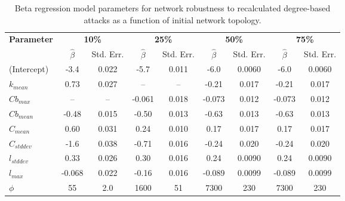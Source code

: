 \begin{table}[!htp]
\scriptsize
\centering

\begin{tabular}{lcccccccc}
\toprule
\multirow{2}{*}{\textbf{Parameter}} & \multicolumn{2}{c}{\textbf{10\%}} & \multicolumn{2}{c}{\textbf{25\%}} & \multicolumn{2}{c}{\textbf{50\%}} & \multicolumn{2}{c}{\textbf{75\%}}\\
 & $\hat{\beta}$ & Std. Err. & $\hat{\beta}$ & Std. Err. & $\hat{\beta}$ & Std. Err. & $\hat{\beta}$ & Std. Err. \\
\midrule

(Intercept) & -3.4 & 0.022 & -5.7 & 0.011 & -6.0 & 0.0060 & -6.0 & 0.0060 \\
$k_{mean}$ & 0.73 & 0.027 & -- & -- & -0.21 & 0.017 & -0.21 & 0.017 \\
$Cb_{max}$ & -- & -- & -0.061 & 0.018 & -0.073 & 0.012 & -0.073 & 0.012 \\
$Cb_{mean}$ & -0.48 & 0.015 & -0.50 & 0.013 & -0.63 & 0.013 & -0.63 & 0.013 \\
$C_{mean}$ & 0.60 & 0.031 & 0.24 & 0.010 & 0.17 & 0.017 & 0.17 & 0.017 \\
$C_{std dev}$ & -1.6 & 0.038 & -0.71 & 0.016 & -0.24 & 0.020 & -0.24 & 0.020 \\
$l_{std dev}$ & 0.33 & 0.026 & 0.30 & 0.016 & 0.24 & 0.0090 & 0.24 & 0.0090 \\
$l_{max}$ & -0.068 & 0.022 & -0.16 & 0.016 & -0.089 & 0.0099 & -0.089 & 0.0099 \\
$\phi$ & 55 & 2.0 & 1600 & 51 & 7300 & 230 & 7300 & 230 \\

\bottomrule

\end{tabular}

\caption[Beta regression model parameters for network robustness to recalculated degree-based attacks.]{\label{tab:ch2:betaregNDr}Beta regression model parameters for network robustness to recalculated degree-based attacks as a function of initial network topology.}
\end{table}



